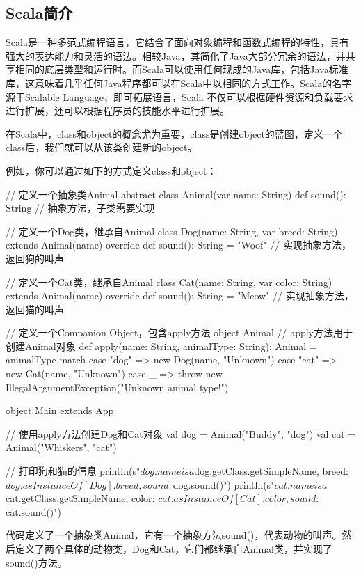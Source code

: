 \subsection{Scala简介}\label{sec:06-agility-007}

Scala是一种多范式编程语言，它结合了面向对象编程和函数式编程的特性，具有强大的表达能力和灵活的语法。相较Java，其简化了Java大部分冗余的语法，并共享相同的底层类型和运行时。而Scala可以使用任何现成的Java库，包括Java标准库，这意味着几乎任何Java程序都可以在Scala中以相同的方式工作。Scala的名字源于Scalable Language，即可拓展语言，Scala 不仅可以根据硬件资源和负载要求进行扩展，还可以根据程序员的技能水平进行扩展。

在Scala中，class和object的概念尤为重要，class是创建object的蓝图，定义一个class后，我们就可以从该类创建新的object。

例如，你可以通过如下的方式定义class和object：

\begin{CodeBlock}[language=BookScala]
// 定义一个抽象类Animal
abstract class Animal(var name: String) {
  def sound(): String // 抽象方法，子类需要实现
}

// 定义一个Dog类，继承自Animal
class Dog(name: String, var breed: String) extends Animal(name) {
  override def sound(): String = "Woof" // 实现抽象方法，返回狗的叫声
}

// 定义一个Cat类，继承自Animal
class Cat(name: String, var color: String) extends Animal(name) {
  override def sound(): String = "Meow" // 实现抽象方法，返回猫的叫声
}

// 定义一个Companion Object，包含apply方法
object Animal {
  // apply方法用于创建Animal对象
  def apply(name: String, animalType: String): Animal = {
    animalType match {
      case "dog" => new Dog(name, "Unknown")
      case "cat" => new Cat(name, "Unknown")
      case _ => throw new IllegalArgumentException("Unknown animal type!")
    }
  }
}

object Main extends App {
  // 使用apply方法创建Dog和Cat对象
  val dog = Animal("Buddy", "dog")
  val cat = Animal("Whiskers", "cat")

  // 打印狗和猫的信息
  println(s"${dog.name} is a ${dog.getClass.getSimpleName}, breed: ${dog.asInstanceOf[Dog].breed}, sound: ${dog.sound()}")
  println(s"${cat.name} is a ${cat.getClass.getSimpleName}, color: ${cat.asInstanceOf[Cat].color}, sound: ${cat.sound()}")
}
\end{CodeBlock}

代码定义了一个抽象类Animal，它有一个抽象方法sound()，代表动物的叫声。然后定义了两个具体的动物类，Dog和Cat，它们都继承自Animal类，并实现了sound()方法。

